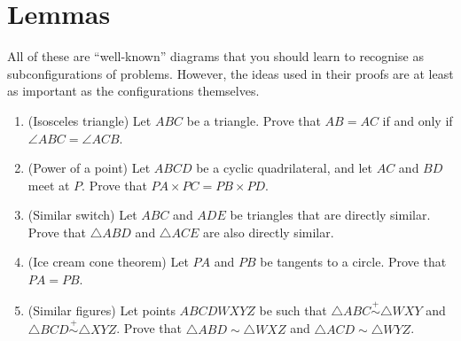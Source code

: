 \documentclass{article}
\begin{document}
\section{Lemmas}
All of these are ``well-known'' diagrams that you should learn to recognise as
subconfigurations of problems. However, the ideas used in their proofs are at
least as important as the configurations themselves.
\begin{enumerate}
  \item (Isosceles triangle) 
    Let $ABC$ be a triangle. Prove that $AB=AC$ if and only if $\angle
    ABC=\angle ACB$. 
  \item (Power of a point)
    Let $ABCD$ be a cyclic quadrilateral, and let $AC$ and $BD$ meet at $P$.
    Prove that $PA\times PC=PB\times PD$. 
  \item (Similar switch)
    Let $ABC$ and $ADE$ be triangles that are directly similar.
    Prove that $\triangle ABD$ and $\triangle ACE$ are also directly similar.
  \item (Ice cream cone theorem)
    Let $PA$ and $PB$ be tangents to a circle. Prove that $PA=PB$.
  \item (Similar figures)
    Let points $ABCDWXYZ$ be such that $\triangle ABC\overset +\sim\triangle WXY$ and
    $\triangle BCD\overset +\sim\triangle XYZ$. Prove that $\triangle
    ABD\sim\triangle WXZ$ and $\triangle ACD\sim\triangle
    WYZ$.


\end{enumerate}
\end{document}

